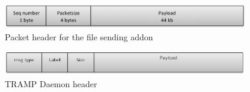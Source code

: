 \begin{figure}[ht!]
\centering
 \includegraphics[width=300pt]{sendpkt.png}
\caption{Packet header for the file sending addon}
\end{figure}

\begin{figure}[ht!]
\centering
 \includegraphics[width=300pt]{tramp_pkt.png}
\caption{TRAMP Daemon header}
\end{figure}




